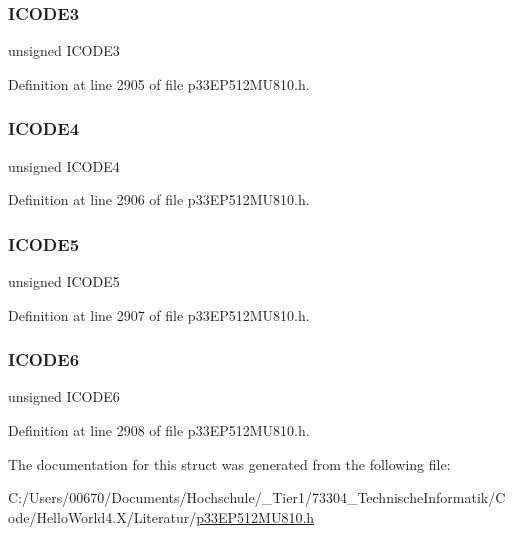 \subsubsection{\texorpdfstring{I\+C\+O\+D\+E3}{ICODE3}}
{\footnotesize\ttfamily unsigned I\+C\+O\+D\+E3}



Definition at line 2905 of file p33\+E\+P512\+M\+U810.\+h.

\mbox{\label{structtag_c1_v_e_c_b_i_t_s_a436cd58140bad7a64953df17114bb50e}} 
\subsubsection{\texorpdfstring{I\+C\+O\+D\+E4}{ICODE4}}
{\footnotesize\ttfamily unsigned I\+C\+O\+D\+E4}



Definition at line 2906 of file p33\+E\+P512\+M\+U810.\+h.

\mbox{\label{structtag_c1_v_e_c_b_i_t_s_af29df0fe9fa862b03f7a3dc52a2fcca5}} 
\subsubsection{\texorpdfstring{I\+C\+O\+D\+E5}{ICODE5}}
{\footnotesize\ttfamily unsigned I\+C\+O\+D\+E5}



Definition at line 2907 of file p33\+E\+P512\+M\+U810.\+h.

\mbox{\label{structtag_c1_v_e_c_b_i_t_s_aec0244cced0a8f2c1703bb463f77de4b}} 
\subsubsection{\texorpdfstring{I\+C\+O\+D\+E6}{ICODE6}}
{\footnotesize\ttfamily unsigned I\+C\+O\+D\+E6}



Definition at line 2908 of file p33\+E\+P512\+M\+U810.\+h.



The documentation for this struct was generated from the following file\+:\begin{DoxyCompactItemize}
\item 
C\+:/\+Users/00670/\+Documents/\+Hochschule/\+\_\+\+Tier1/73304\+\_\+\+Technische\+Informatik/\+Code/\+Hello\+World4.\+X/\+Literatur/\hyperlink{p33_e_p512_m_u810_8h}{p33\+E\+P512\+M\+U810.\+h}\end{DoxyCompactItemize}
